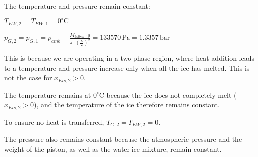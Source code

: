 The temperature and pressure remain constant:  

\( T_{EW,2} = T_{EW,1} = 0^\circ \text{C} \)  

\( p_{G,2} = p_{G,1} = p_{amb} + \frac{M_{kolben} \cdot g}{\pi \cdot \left(\frac{D}{2}\right)^2} = 133570 \, \text{Pa} = 1.3357 \, \text{bar} \)  

This is because we are operating in a two-phase region, where heat addition leads to a temperature and pressure increase only when all the ice has melted. This is not the case for \( x_{Eis,2} > 0 \).  

The temperature remains at \( 0^\circ \text{C} \) because the ice does not completely melt (\( x_{Eis,2} > 0 \)), and the temperature of the ice therefore remains constant.  

To ensure no heat is transferred, \( T_{G,2} = T_{EW,2} = 0 \).  

The pressure also remains constant because the atmospheric pressure and the weight of the piston, as well as the water-ice mixture, remain constant.